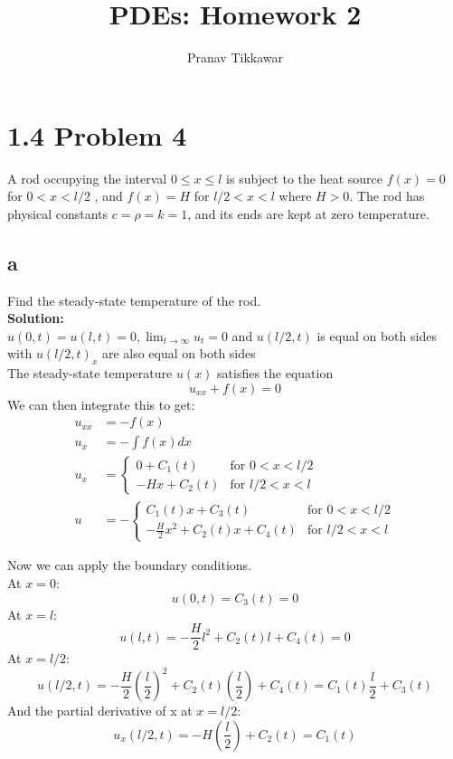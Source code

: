 \documentclass{article}
\author{Pranav Tikkawar}
\title{PDEs: Homework 2}
\begin{document}
\maketitle

\section*{1.4 Problem 4}
A rod occupying the interval $0 \leq x \leq l$ is subject to the heat source
$f(x) = 0$ for $0 < x < l/2$ , and $f(x) = H$ for $l/2 < x < l$ where $H > 0$. The rod has physical constants $c = \rho = k = 1$, and its ends are kept at zero temperature.
\subsection*{a} 
Find the steady-state temperature of the rod.\\
\textbf{Solution:} \\
$u(0, t) = u(l, t) = 0, \lim_{t \rightarrow \infty} u_t = 0$ and $u(l/2, t)$ is equal on both sides with $u(l/2,t)_x$ are also equal on both sides\\
The steady-state temperature $u(x)$ satisfies the equation
$$ u_{xx} + f(x) = 0 $$
We can then integrate this to get:
\begin{align*}
u_{xx} &= -f(x) \\
u_{x} &= -\int f(x) dx \\
u_{x} &= \begin{cases}
0 + C_1(t) & \text{for } 0 < x < l/2 \\
-Hx + C_2(t) & \text{for } l/2 < x < l
\end{cases}\\
u &= -\begin{cases}
C_1(t)x + C_3(t) & \text{for } 0 < x < l/2 \\
-\frac{H}{2}x^2 + C_2(t)x + C_4(t) & \text{for } l/2 < x < l
\end{cases}
\end{align*}

Now we can apply the boundary conditions.\\

At $x = 0$:
$$u(0,t) = C_3(t) = 0$$
At $x = l$:
$$u(l,t) = -\frac{H}{2}l^2 + C_2(t)l + C_4(t) = 0$$
At $x = l/2$:
$$u(l/2,t) = -\frac{H}{2}\left(\frac{l}{2}\right)^2 + C_2(t)\left(\frac{l}{2}\right) + C_4(t) = C_1(t)\frac{l}{2} + C_3(t)$$
And the partial derivative of x at $x = l/2$:
$$u_x(l/2,t) = -H\left(\frac{l}{2}\right) + C_2(t) = C_1(t)$$
\end{document}
